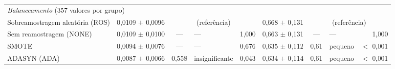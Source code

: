 \begin{table}[htbp]
\begin{tabular}{lcclrcclr}
        \midrule
        \multicolumn{9}{l}{\textit{Balanceamento} (357 valores por grupo)} \\
        \quad Sobreamostragem aleatória (ROS) & 0,0109 $\pm$ 0,0096 & \multicolumn{3}{c}{(referência)} & 0,668 $\pm$ 0,131 & \multicolumn{3}{c}{(referência)} \\
        \quad Sem reamostragem (NONE) & 0,0109 $\pm$ 0,0100 & --- & --- & 1,000 & 0,663 $\pm$ 0,131 & --- & --- & 1,000 \\
        \quad SMOTE & 0,0094 $\pm$ 0,0076 & --- & --- & 0,676 & 0,635 $\pm$ 0,112 & 0,61 & pequeno & $<$ 0,001 \\
        \quad ADASYN (ADA) & 0,0087 $\pm$ 0,0066 & 0,558 & insignificante & 0,043 & 0,634 $\pm$ 0,114 & 0,61 & pequeno & $<$ 0,001 \\
        \bottomrule
    \end{tabular}
\end{table}%
